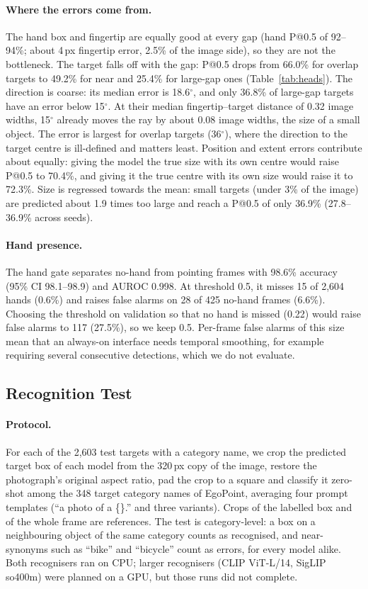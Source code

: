 \paragraph{Where the errors come from.} The hand box and fingertip are equally good at every gap (hand P@0.5 of 92--94\%; about 4\,px fingertip error, 2.5\% of the image side), so they are not the bottleneck. The target falls off with the gap: P@0.5 drops from 66.0\% for overlap targets to 49.2\% for near and 25.4\% for large-gap ones (Table~\ref{tab:heads}). The direction is coarse: its median error is 18.6$^\circ$, and only 36.8\% of large-gap targets have an error below 15$^\circ$. At their median fingertip--target distance of 0.32 image widths, 15$^\circ$ already moves the ray by about 0.08 image widths, the size of a small object. The error is largest for overlap targets (36$^\circ$), where the direction to the target centre is ill-defined and matters least. Position and extent errors contribute about equally: giving the model the true size with its own centre would raise P@0.5 to 70.4\%, and giving it the true centre with its own size would raise it to 72.3\%. Size is regressed towards the mean: small targets (under 3\% of the image) are predicted about 1.9 times too large and reach a P@0.5 of only 36.9\% (27.8--36.9\% across seeds).

\paragraph{Hand presence.} The hand gate separates no-hand from pointing frames with 98.6\% accuracy (95\% CI 98.1--98.9) and AUROC 0.998. At threshold 0.5, it misses 15 of 2,604 hands (0.6\%) and raises false alarms on 28 of 425 no-hand frames (6.6\%). Choosing the threshold on validation so that no hand is missed (0.22) would raise false alarms to 117 (27.5\%), so we keep 0.5. Per-frame false alarms of this size mean that an always-on interface needs temporal smoothing, for example requiring several consecutive detections, which we do not evaluate.

\subsection{Recognition Test}\label{app:recog}

\paragraph{Protocol.} For each of the 2,603 test targets with a category name, we crop the predicted target box of each model from the 320\,px copy of the image, restore the photograph's original aspect ratio, pad the crop to a square and classify it zero-shot among the 348 target category names of EgoPoint, averaging four prompt templates (``a photo of a \{\}.'' and three variants). Crops of the labelled box and of the whole frame are references. The test is category-level: a box on a neighbouring object of the same category counts as recognised, and near-synonyms such as ``bike'' and ``bicycle'' count as errors, for every model alike. Both recognisers ran on CPU; larger recognisers (CLIP ViT-L/14, SigLIP so400m) were planned on a GPU, but those runs did not complete.

